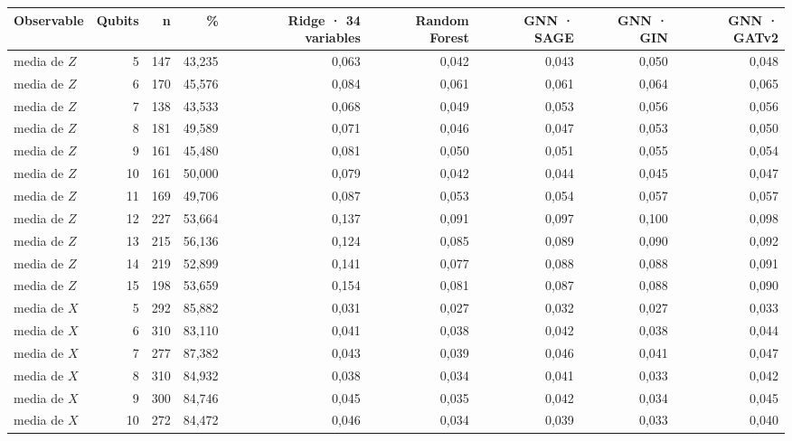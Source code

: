 \begin{table}[htbp]
    \centering
    {\footnotesize
    \begin{tabular}{@{}lrrrrrrrr@{}}
        \toprule
        \textbf{Observable} & \textbf{Qubits} & \textbf{n} & \textbf{\%} & \textbf{Ridge · 34 variables} & \textbf{Random Forest} & \textbf{GNN · SAGE} & \textbf{GNN · GIN} & \textbf{GNN · GATv2} \\
        \midrule
        media de $Z$ & 5 & 147 & 43,235 & 0,063 & 0,042 & 0,043 & 0,050 & 0,048 \\
        media de $Z$ & 6 & 170 & 45,576 & 0,084 & 0,061 & 0,061 & 0,064 & 0,065 \\
        media de $Z$ & 7 & 138 & 43,533 & 0,068 & 0,049 & 0,053 & 0,056 & 0,056 \\
        media de $Z$ & 8 & 181 & 49,589 & 0,071 & 0,046 & 0,047 & 0,053 & 0,050 \\
        media de $Z$ & 9 & 161 & 45,480 & 0,081 & 0,050 & 0,051 & 0,055 & 0,054 \\
        media de $Z$ & 10 & 161 & 50,000 & 0,079 & 0,042 & 0,044 & 0,045 & 0,047 \\
        media de $Z$ & 11 & 169 & 49,706 & 0,087 & 0,053 & 0,054 & 0,057 & 0,057 \\
        media de $Z$ & 12 & 227 & 53,664 & 0,137 & 0,091 & 0,097 & 0,100 & 0,098 \\
        media de $Z$ & 13 & 215 & 56,136 & 0,124 & 0,085 & 0,089 & 0,090 & 0,092 \\
        media de $Z$ & 14 & 219 & 52,899 & 0,141 & 0,077 & 0,088 & 0,088 & 0,091 \\
        media de $Z$ & 15 & 198 & 53,659 & 0,154 & 0,081 & 0,087 & 0,088 & 0,090 \\
        media de $X$ & 5 & 292 & 85,882 & 0,031 & 0,027 & 0,032 & 0,027 & 0,033 \\
        media de $X$ & 6 & 310 & 83,110 & 0,041 & 0,038 & 0,042 & 0,038 & 0,044 \\
        media de $X$ & 7 & 277 & 87,382 & 0,043 & 0,039 & 0,046 & 0,041 & 0,047 \\
        media de $X$ & 8 & 310 & 84,932 & 0,038 & 0,034 & 0,041 & 0,033 & 0,042 \\
        media de $X$ & 9 & 300 & 84,746 & 0,045 & 0,035 & 0,042 & 0,034 & 0,045 \\
        media de $X$ & 10 & 272 & 84,472 & 0,046 & 0,034 & 0,039 & 0,033 & 0,040 \\

\end{tabular}}
\end{table}
